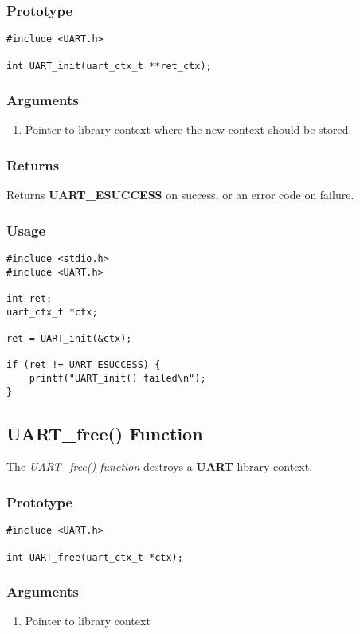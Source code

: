 \documentclass{report}
\begin{document}
\subsubsection*{Prototype}
\begin{lstlisting}
#include <UART.h>

int UART_init(uart_ctx_t **ret_ctx);
\end{lstlisting}
\subsubsection*{Arguments}
\begin{enumerate}
\item Pointer to library context where the new context should be stored.
\end{enumerate}
\subsubsection*{Returns}
Returns \textbf{UART\_ESUCCESS} on success, or an error code on failure.
\subsubsection*{Usage}
\begin{lstlisting}
#include <stdio.h>
#include <UART.h>

int ret;
uart_ctx_t *ctx;

ret = UART_init(&ctx);

if (ret != UART_ESUCCESS) {
    printf("UART_init() failed\n");
}
\end{lstlisting}
\subsection{UART\_free() Function}
The \textit{UART\_free() function} destroys a \textbf{UART} library context.
\subsubsection*{Prototype}
\begin{lstlisting}
#include <UART.h>

int UART_free(uart_ctx_t *ctx);
\end{lstlisting}
\subsubsection*{Arguments}
\begin{enumerate}
\item Pointer to library context
\end{enumerate}
\end{document}
